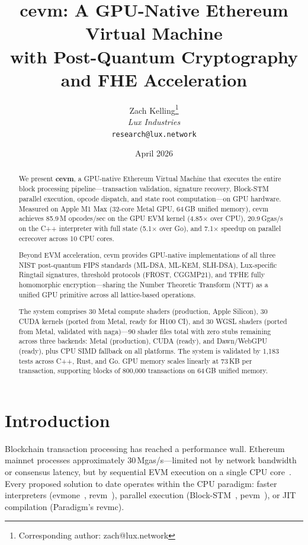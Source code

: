 \documentclass[11pt]{article}
\title{cevm: A GPU-Native Ethereum Virtual Machine\\with Post-Quantum Cryptography and FHE Acceleration}
\author{
Zach Kelling\thanks{Corresponding author: zach@lux.network}\\
\textit{Lux Industries}\\
\texttt{research@lux.network}
}
\date{April 2026}
\begin{document}
\luxcoverpage

\begin{abstract}
We present \textbf{cevm}, a GPU-native Ethereum Virtual Machine that executes the entire
block processing pipeline---transaction validation, signature recovery, Block-STM parallel
execution, opcode dispatch, and state root computation---on GPU hardware. Measured on
Apple M1 Max (32-core Metal GPU, 64\,GB unified memory), cevm achieves 85.9\,M opcodes/sec
on the GPU EVM kernel (4.85$\times$ over CPU), 20.9\,Ggas/s on the C++ interpreter with
full state (5.1$\times$ over Go), and 7.1$\times$ speedup on parallel ecrecover across 10 CPU
cores.

Beyond EVM acceleration, cevm provides GPU-native implementations of all three NIST
post-quantum FIPS standards (ML-DSA, ML-KEM, SLH-DSA), Lux-specific Ringtail signatures,
threshold protocols (FROST, CGGMP21), and TFHE fully homomorphic encryption---sharing
the Number Theoretic Transform (NTT) as a unified GPU primitive across all lattice-based
operations.

The system comprises 30 Metal compute shaders (production, Apple Silicon), 30 CUDA kernels
(ported from Metal, ready for H100 CI), and 30 WGSL shaders (ported from Metal, validated
with naga)---90 shader files total with zero stubs remaining across three backends: Metal
(production), CUDA (ready), and Dawn/WebGPU (ready), plus CPU SIMD fallback on all
platforms. The system is validated by 1{,}183 tests across C++, Rust, and Go. GPU memory
scales linearly at 73\,KB per transaction, supporting blocks of 800{,}000 transactions on
64\,GB unified memory.
\end{abstract}

\tableofcontents
\newpage

\section{Introduction}
\label{sec:intro}

Blockchain transaction processing has reached a performance wall. Ethereum mainnet
processes approximately 30\,Mgas/s---limited not by network bandwidth or consensus
latency, but by sequential EVM execution on a single CPU core~\cite{pevm}. Every
proposed solution to date operates within the CPU paradigm: faster interpreters
(evmone~\cite{evmone}, revm~\cite{reth}), parallel execution (Block-STM~\cite{blockstm},
pevm~\cite{pevm}), or JIT compilation (Paradigm's revmc).
\end{document}
